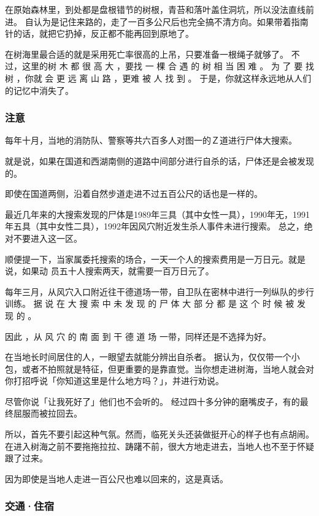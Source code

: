 \documentclass[UTF8]{ctexart}
\begin{document}
在原始森林里，到处都是盘根错节的树根，青苔和落叶盖住洞坑，所以没法直线前进。
自认为是记住来路的，走了一百多公尺后也完全搞不清方向。如果带着指南针的话，就把它扔掉，反正都不能再回到原地了。

在树海里最合适的就是采用死亡率很高的上吊，只要准备一根绳子就够了。
不过，这里的树 木 都 很 高 大 ，要找 一 棵 合 遇 的 树 相 当 困 难 。
为 了 要 找 树 ，你就 会 更 远 离 山 路 ，更难 被 人 找 到 。 
于是，你就这样永远地从人们的记忆中消失了。

\subsubsection{注意}

每年十月，当地的消防队、警察等共六百多人对图一的Ｚ道进行尸体大搜索。

就是说，如果在国道和西湖南侧的道路中间部分进行自杀的话，尸体还是会被发现的。

即使在国道两侧，沿着自然步道走进不过五百公尺的话也是一样的。

最近几年来的大搜索发现的尸体是1989年三具（其中女性一具），1990年无，1991年五具（其中女性二具），1992年因风穴附近发生杀人事件未进行搜索。
总之，绝对不要进入这一区。

顺便提一下，当家属委托搜索的场合，一天一个人的搜索费用是一万日元。就是说，如果动
员五十人搜索两天，就需要一百万日元了。

每年三月，从风穴入口附近往干德道场一带，自卫队在密林中进行一列纵队的步行训练。
据 说 在 大 搜 索 中 未 发 现 的 尸 体 大 部 分 都 是 这 个 时 候 被 发 现 的 。

因此 ，从 风 穴 的 南 面 到 干 德 道 场 一带，同样还是不选择为好。

在当地长时间居住的人，一眼望去就能分辨出自杀者。
据认为，仅仅带一个小包，或者不拍照就是特征，但更重要的是靠直觉。当你想走进树海，当地人就会对你打招呼说「你知道这里是什么地方吗？」，并进行劝说。

尽管你说「让我死好了」他们也不会听的。
经过四十多分钟的磨嘴皮子，有的最终屈服而被拉回去。

所以，首先不要引起这种气氛。然而，临死关头还装做挺开心的样子也有点胡闹。
在进入树海之前不要拖拖拉拉、踌躇不前，很大方地走进去，当地人也不至于怀疑跟了过来。

因为即使是当地人走进一百公尺也难以回来的，这是真话。

\subsubsection{交通·住宿}
\end{document}
